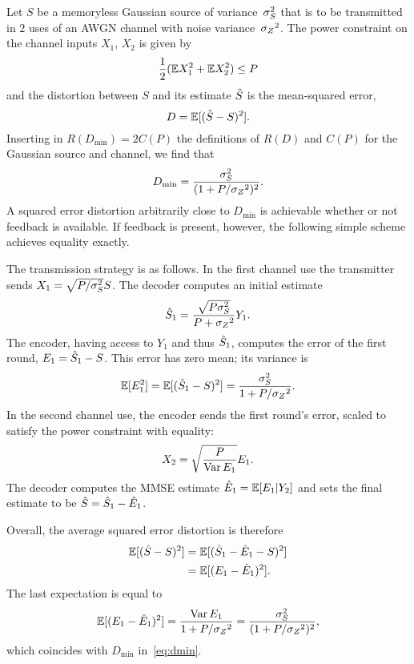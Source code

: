 Let $S$ be a memoryless Gaussian source of variance~${\sigma_S^2}$ that is to be
transmitted in $2$ uses of an AWGN channel with noise variance~${{\sigma_Z}^2}$. The power
constraint on the channel inputs $X_1$, $X_2$ is given by
\begin{equation*}
  \frac12 ( \mathbb{E} X_1^2 + \mathbb{E} X_2^2) \le P
\end{equation*}
and the distortion between $S$ and its estimate ${\hat{S}}$ is the mean-squared error,
\begin{equation*}
  D = \mathbb{E}[({\hat{S}} - S)^2].
\end{equation*}
Inserting in $R(D_{\min}) = 2C(P)$ the definitions of $R(D)$ and $C(P)$ for the
Gaussian source and channel, we find that
\begin{equation}
  \label{eq:dmin}
  D_{\min} = \frac{{\sigma_S^2}}{(1 + P/{{\sigma_Z}^2})^2}.
\end{equation}
A squared error distortion arbitrarily close to $D_{\min}$ is achievable whether
or not feedback is available. If feedback is present, however, the following
simple scheme achieves equality exactly.

The transmission strategy is as follows.  In the first channel use the
transmitter sends $X_1 = \sqrt{P/{\sigma_S^2}} S$. The decoder computes an initial
estimate
\begin{equation*}
  {\hat{S}}_1 = \frac{\sqrt{P {\sigma_S^2}}}{P + {{\sigma_Z}^2}} Y_1.
\end{equation*}
The encoder, having access to $Y_1$ and thus ${\hat{S}}_1$, computes the error of the
first round, $E_1 = {\hat{S}}_1 - S$. This error has zero mean; its variance is
\begin{equation*}
  \mathbb{E}[E_1^2] = \mathbb{E}[({\hat{S}}_1 - S)^2] = \frac{{\sigma_S^2}}{1 + P/{{\sigma_Z}^2}}.
\end{equation*}
In the second channel use, the encoder sends the first round's error, scaled to
satisfy the power constraint with equality:
\begin{equation*}
  X_2 = \sqrt{\frac{P}{\operatorname{Var} E_1}} E_1.
\end{equation*}
The decoder computes the MMSE estimate $\hat{E}_1 = \mathbb{E}[E_1|Y_2]$ and sets the final
estimate to be ${\hat{S}} = {\hat{S}}_1 - \hat{E}_1$. 

Overall, the average squared error distortion is therefore
\begin{align*}
  {\mathbb{E}[({\hat{S}}- S)^2]} &= \mathbb{E}[({\hat{S}}_1 - \hat{E}_1 - S)^2] \\
  &= \mathbb{E}[(E_1 - \hat{E}_1)^2].
\end{align*}
The last expectation is equal to 
\begin{equation*}
  \mathbb{E}[(E_1 - \hat{E}_1)^2] = \frac{\operatorname{Var}{E_1}}{1 + P/{{\sigma_Z}^2}} = \frac{{\sigma_S^2}}{(1 +
  P/{{\sigma_Z}^2})^2},
\end{equation*}
which coincides with $D_{\min}$ in~\eqref{eq:dmin}.

